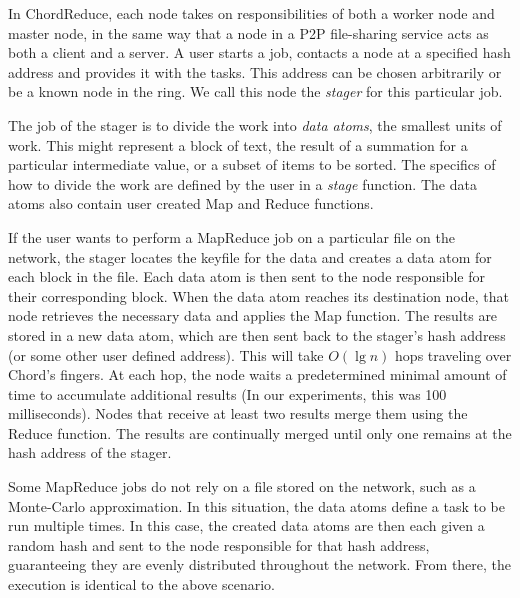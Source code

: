 In ChordReduce, each node takes on responsibilities of both a worker node and master node, in the same way that a node in a P2P file-sharing service acts as both a client and a server.
A user starts a job, contacts a node at a specified hash address and provides it with the tasks.
This address can be chosen arbitrarily or be a known node in the ring.
We call this node the \textit{stager} for this particular job.

The job of the stager is to divide the work into \emph{data atoms}, the smallest units of work.
This might represent a block of text, the result of a summation for a particular intermediate value, or a subset of items to be sorted.
The specifics of how to divide the work are defined by the user in a \emph{stage} function.
The data atoms also contain user created Map and Reduce functions.

If the user wants to perform a MapReduce job on a particular file on the network, the stager locates the keyfile for the data and creates a data atom for each block in the file.
Each data atom is then sent to the node responsible for their corresponding block.
When the data atom reaches its destination node, that node retrieves the necessary data and applies the Map function.
The results are stored in a new data atom,  which are then sent back to the stager's hash address (or some other user defined address).
This will take $O(\lg n)$ hops traveling over Chord's fingers.
At each hop, the node waits a predetermined minimal amount of time to accumulate additional results (In our experiments, this was 100 milliseconds).
Nodes that receive at least two results merge them using the Reduce function.
The results are continually merged until only one remains at the hash address of the stager.


Some MapReduce jobs do not rely on a file stored on the network, such as a Monte-Carlo approximation.
In this situation, the data atoms define a task to be run multiple times.
In this case, the created data atoms are then each given a random hash and sent to the node responsible for that hash address, guaranteeing they are evenly distributed throughout the network.
From there, the execution is identical to the above scenario.



